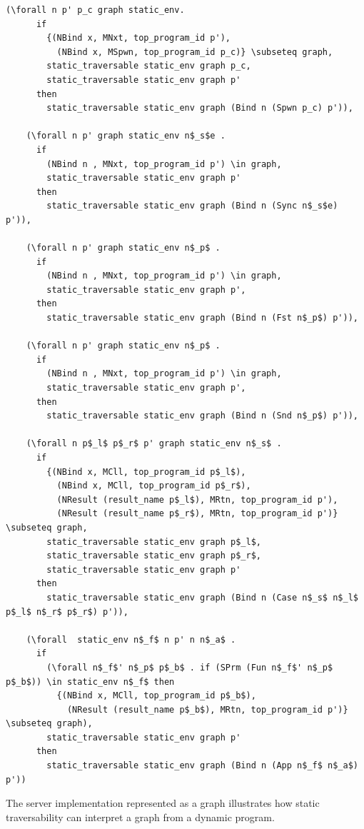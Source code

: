 \documentclass[10pt]{article}
\begin{document}
\begin{lstlisting}[language=logic, mathescape]
    (\forall n p' p_c graph static_env.
      if
        {(NBind x, MNxt, top_program_id p'),
          (NBind x, MSpwn, top_program_id p_c)} \subseteq graph, 
        static_traversable static_env graph p_c, 
        static_traversable static_env graph p'
      then
        static_traversable static_env graph (Bind n (Spwn p_c) p')),

    (\forall n p' graph static_env n$_s$e .
      if
        (NBind n , MNxt, top_program_id p') \in graph, 
        static_traversable static_env graph p'
      then
        static_traversable static_env graph (Bind n (Sync n$_s$e) p')),

    (\forall n p' graph static_env n$_p$ .
      if
        (NBind n , MNxt, top_program_id p') \in graph, 
        static_traversable static_env graph p', 
      then
        static_traversable static_env graph (Bind n (Fst n$_p$) p')),

    (\forall n p' graph static_env n$_p$ .
      if
        (NBind n , MNxt, top_program_id p') \in graph, 
        static_traversable static_env graph p', 
      then
        static_traversable static_env graph (Bind n (Snd n$_p$) p')),

    (\forall n p$_l$ p$_r$ p' graph static_env n$_s$ .
      if
        {(NBind x, MCll, top_program_id p$_l$),
          (NBind x, MCll, top_program_id p$_r$),
          (NResult (result_name p$_l$), MRtn, top_program_id p'),
          (NResult (result_name p$_r$), MRtn, top_program_id p')} \subseteq graph, 
        static_traversable static_env graph p$_l$, 
        static_traversable static_env graph p$_r$,
        static_traversable static_env graph p'
      then
        static_traversable static_env graph (Bind n (Case n$_s$ n$_l$ p$_l$ n$_r$ p$_r$) p')),

    (\forall  static_env n$_f$ n p' n n$_a$ .
      if
        (\forall n$_f$' n$_p$ p$_b$ . if (SPrm (Fun n$_f$' n$_p$ p$_b$)) \in static_env n$_f$ then 
          {(NBind x, MCll, top_program_id p$_b$),
            (NResult (result_name p$_b$), MRtn, top_program_id p')} \subseteq graph),
        static_traversable static_env graph p'
      then
        static_traversable static_env graph (Bind n (App n$_f$ n$_a$) p'))
  \end{lstlisting}

The server implementation represented as a graph illustrates how static traversability can interpret
a graph from a dynamic program.
\end{document}
